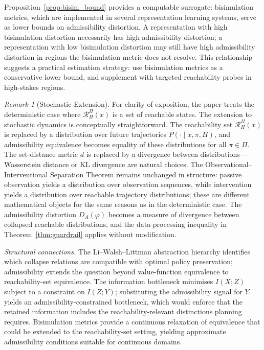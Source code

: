 \documentclass[11pt, a4paper]{article}
\theoremstyle{plain}
\theoremstyle{definition}
\theoremstyle{remark}
\newtheorem{remark}{Remark}
\newcommand{\RHP}{\mathcal{R}_H^\Pi}
\newcommand{\DA}{D_A(\varphi)}
\begin{document}
Proposition~\ref{prop:bisim_bound} provides a computable surrogate:
bisimulation metrics, which are implemented in several representation
learning systems, serve as lower bounds on admissibility distortion. A
representation with high bisimulation distortion necessarily has high
admissibility distortion; a representation with low bisimulation distortion
may still have high admissibility distortion in regions the bisimulation
metric does not resolve. This relationship suggests a practical estimation
strategy: use bisimulation metrics as a conservative lower bound, and
supplement with targeted reachability probes in high-stakes regions.

\begin{remark}[Stochastic Extension]
\label{rem:stochastic}
For clarity of exposition, the paper treats the deterministic case where
$\RHP(x)$ is a set of reachable states. The extension to stochastic dynamics
is conceptually straightforward. The reachability set $\RHP(x)$ is replaced
by a distribution over future trajectories $P(\cdot \mid x, \pi, H)$, and
admissibility equivalence becomes equality of these distributions for all
$\pi \in \Pi$. The set-distance metric $d$ is replaced by a divergence
between distributions---Wasserstein distance or KL divergence are natural
choices. The Observational--Interventional Separation Theorem remains
unchanged in structure: passive observation yields a distribution over
observation sequences, while intervention yields a distribution over reachable
trajectory distributions; these are different mathematical objects for the
same reasons as in the deterministic case. The admissibility distortion
$\DA$ becomes a measure of divergence between collapsed reachable
distributions, and the data-processing inequality in
Theorem~\ref{thm:guardrail} applies without modification.
\end{remark}

\emph{Structural connections.} The Li--Walsh--Littman \citeyearpar{li2006towards}
abstraction hierarchy identifies which collapse relations are compatible with
optimal policy preservation; admissibility extends the question beyond
value-function equivalence to reachability-set equivalence. The information
bottleneck \citep{tishby1999information} minimises $I(X; Z)$ subject to a
constraint on $I(Z; Y)$; substituting the admissibility signal for $Y$ yields
an admissibility-constrained bottleneck, which would enforce that the retained
information includes the reachability-relevant distinctions planning requires.
Bisimulation metrics \citep{ferns2004metrics} provide a continuous relaxation
of equivalence that could be extended to the reachability-set setting, yielding
approximate admissibility conditions suitable for continuous domains.
\end{document}
